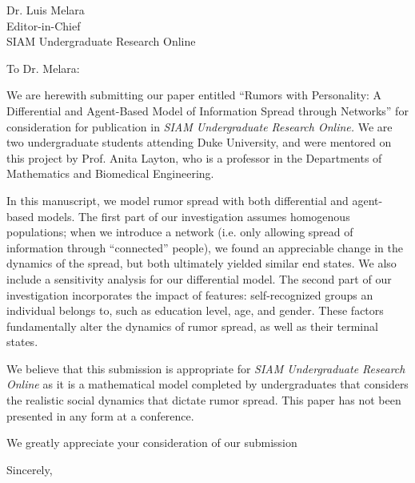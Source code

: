 \documentclass{letter}
\makeatletter
\renewcommand{\closing}[1]{\par\nobreak\vspace{\parskip}%
  \stopbreaks
  \noindent
  \ifx\@empty\fromaddress\else
  \hspace*{\longindentation}\fi
  \parbox{\indentedwidth}{\raggedright
       \ignorespaces #1\\[2\medskipamount]%
       \ifx\@empty\fromsig
           \fromname
       \else \fromsig \fi\strut}%
   \par}
\makeatother
\begin{document}
\begin{letter}{Dr. Luis Melara\\
Editor-in-Chief\\
SIAM Undergraduate Research Online\\}
\opening{To Dr. Melara:}

We are herewith submitting our paper entitled ``Rumors with Personality: A Differential and Agent-Based Model of Information Spread through Networks'' for consideration for publication in \textit{SIAM Undergraduate Research Online.} We are two undergraduate students attending Duke University, and were mentored on this project by Prof. Anita Layton, who is a professor in the Departments of Mathematics and Biomedical Engineering.

In this manuscript, we model rumor spread with both differential and agent-based models. The first part of our investigation assumes homogenous populations; when we introduce a network (i.e. only allowing spread of information through ``connected'' people), we found an appreciable change in the dynamics of the spread, but both ultimately yielded similar end states. We also include a sensitivity analysis for our differential model. The second part of our investigation incorporates the impact of features: self-recognized groups an individual belongs to, such as education level, age, and gender. These factors fundamentally alter the dynamics of rumor spread, as well as their terminal states.

We believe that this submission is appropriate for \textit{SIAM Undergraduate Research Online} as it is a mathematical model completed by undergraduates that considers the realistic social dynamics that dictate rumor spread. This paper has not been presented in any form at a conference.

We greatly appreciate your consideration of our submission
\vspace{24pt}
\closing{Sincerely,}

\end{letter}
\end{document}

